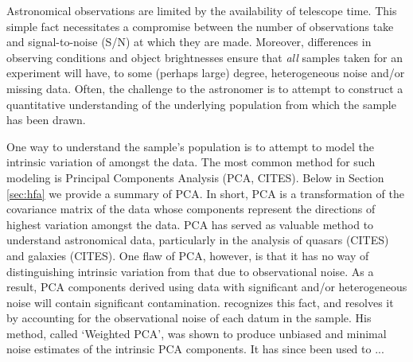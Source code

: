 \documentclass[12pt,preprint]{aastex}
\begin{document}
Astronomical observations are limited by the availability of telescope 
time.  This simple fact necessitates a compromise between the number of 
observations take and signal-to-noise (S/N) at which they are made.  
Moreover, differences in observing conditions and object brightnesses 
ensure that \emph{all} samples taken for an experiment will have, 
to some (perhaps large) degree, heterogeneous noise and/or missing data.  
Often, the challenge to the astronomer is to attempt to construct a 
quantitative understanding of the underlying population from which the 
sample has been drawn.

One way to understand the sample's population is to attempt to model the 
intrinsic variation of amongst the data.  The most common method for such 
modeling is Principal Components Analysis (PCA, CITES).  Below in Section 
\ref{sec:hfa} we provide a summary of PCA.  In short, PCA is a transformation 
of the covariance matrix of the data whose components represent the directions 
of highest variation amongst the data.  PCA has served as valuable method to 
understand astronomical data, particularly in the analysis of quasars (CITES) and 
galaxies (CITES).  One flaw of PCA, however, is that it has no way of distinguishing 
intrinsic variation from that due to observational noise.  As a result, PCA components 
derived using data with significant and/or heterogeneous noise will contain 
significant contamination.  \citet{bailey12} recognizes this fact, and resolves it 
by accounting for the observational noise of each datum in the sample.  His method, 
called `Weighted PCA', was shown to produce unbiased and minimal noise estimates 
of the intrinsic PCA components.  It has since been used to ...
\end{document}

